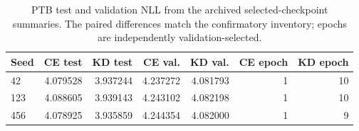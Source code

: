 \begin{table}[!t]\centering
\begin{tabular}{lrrrrrr}
\toprule
Seed & CE test & KD test & CE val. & KD val. & CE epoch & KD epoch \\
\midrule
42 & 4.079528 & 3.937244 & 4.237272 & 4.081793 & 1 & 10 \\
123 & 4.088605 & 3.939143 & 4.243102 & 4.082198 & 1 & 10 \\
456 & 4.078925 & 3.935859 & 4.244354 & 4.082000 & 1 & 9 \\
\bottomrule
\end{tabular}
\caption{PTB test and validation NLL from the archived selected-checkpoint summaries. The paired differences match the confirmatory inventory; epochs are independently validation-selected.}\label{tab:ptb_endpoints}
\end{table}
